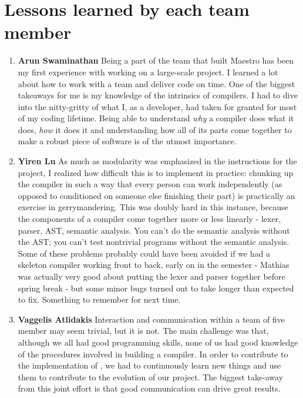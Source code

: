 \section{Lessons learned by each team member}
\begin{enumerate}
\item \textbf{Arun Swaminathan} \newline
Being a part of the team that built Maestro has been my first experience with working on a large-scale project. I learned a lot about how to work with a team and deliver code on time.
One of the biggest takeaways for me is my knowledge of the intrinsics of compilers. I had to dive into the nitty-gritty of what I, as a developer, had taken for granted for most of my coding lifetime. Being able to understand \textit{why} a compiler does what it does, \textit{how} it does it and understanding how all of its parts come together to make a robust piece of software is of the utmost importance.

\item \textbf{Yiren Lu} \newline
As much as modularity was emphasized in the instructions for the project, I
realized how difficult this is to implement in practice: chunking up the
compiler in such a way that every person can work independently (as opposed to
conditioned on someone else finishing their part) is practically an exercise in
gerrymandering. This was doubly hard in this instance, because the components
of a compiler come together more or less linearly - lexer, parser, AST,
semantic analysis. You can't do the semantic analysis without the AST; you
can't test nontrivial programs without the semantic analysis. Some of these
problems probably could have been avoided if we had a skeleton compiler working
front to back, early on in the semester - Mathias was actually very good about
putting the lexer and parser together before spring break - but some minor bugs
turned out to take longer than expected to fix. Something to remember for next
time.

\item \textbf{Vaggelis Atlidakis} \newline
Interaction and communication within a team of five member may seem trivial,
but it is not. The main challenge was that, although we all had
good programming skills, none of us had good knowledge of the procedures
involved in building a compiler. In order to contribute to the implementation
of \lang{}, we had to continuously learn new things and use them to contribute
to the evolution of our project. The biggest take-away from this joint effort is
that good communication can drive great results.



\end{enumerate}
